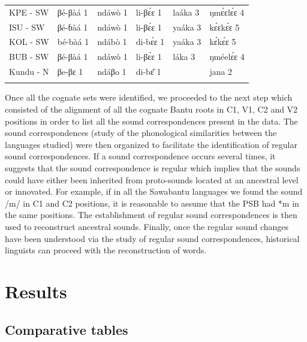 \documentclass[output=paper,colorlinks,citecolor=brown
]{langscibook}
\begin{document}
\begin{table}
\begin{tabular}{llllll}
KPE - SW                   & βé-βàá 1           & ndáwò 1                 & li-βɛ́ɛ 1                & laáka 3                  & ŋmɛ́ɛlɛ́ɛ 4                 \\
ISU - SW                   & βé-ɓàá 1           & ndáwò 1                 & li-βɛ́ɛ 1                & yaáka 3                  & kɛ́ɛkɛ́ɛ 5                  \\
KOL - SW                   & bé-bàá 1           & ndábò 1                 & di-bɛ́ɛ 1                & yaáka 3                  & kɛ́kɛ́ɛ 5                   \\
BUB - SW                   & βé-βàá 1           & ndáwò 1                 & li-βɛ́ɛ 1                & láka 3                   & ŋméelɛ́ɛ 4                 \\
Kundu - N                  & βe-βɛ 1               & ndáβo 1                 & di-bɛ̂ 1                 &                           & jana 2 \\                    
   \lspbottomrule
 \end{tabular}
\end{table}

Once all the cognate sets were identified, we proceeded to the next step which consisted of the alignment of all the cognate Bantu roots in C1, V1, C2 and V2 positions in order to list all the sound correspondences present in the data. The sound correspondences (study of the phonological similarities between the languages studied) were then organized to facilitate the identification of regular sound correspondences. If a sound correspondence occurs several times, it suggests that the sound correspondence is regular which implies that the sounds could have either been inherited from proto-sounds located at an ancestral level or innovated. For example, if in all the Sawabantu languages we found the sound /m/ in C1 and C2 positions, it is reasonable to assume that the PSB had *m in the same positions. The establishment of regular sound correspondences is then used to reconstruct ancestral sounds. Finally, once the regular sound changes have been understood via the study of regular sound correspondences, historical linguists can proceed with the reconstruction of words. 

\section{Results}
\largerpage
\subsection{Comparative tables} \label{sect:browngrollemundrule:comparativetables}
\end{document}
